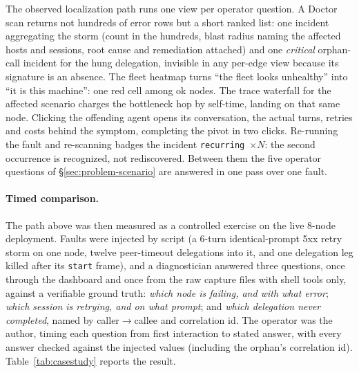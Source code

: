 The observed localization path runs one view per operator question. A
Doctor scan returns not hundreds of error rows but a short ranked list:
one incident aggregating the storm (count in the hundreds, blast radius
naming the affected hosts and sessions, root cause and remediation
attached) and one \emph{critical} orphan-call incident for the hung
delegation, invisible in any per-edge view because its signature is an
absence. The fleet heatmap turns ``the fleet looks unhealthy'' into
``it is this machine'': one red cell among ok nodes. The trace
waterfall for the affected scenario charges the bottleneck hop by
self-time, landing on that same node. Clicking the offending agent
opens its conversation, the actual turns, retries and costs behind the
symptom, completing the pivot in two clicks. Re-running the fault
and re-scanning badges the incident \texttt{recurring $\times N$}: the
second occurrence is recognized, not rediscovered. Between them the five
operator questions of \S\ref{sec:problem-scenario} are answered in one
pass over one fault.

\paragraph{Timed comparison.} The path above was then measured as a
controlled exercise on the live 8-node deployment. Faults were injected
by script (a 6-turn identical-prompt 5xx retry storm on one node, twelve
peer-timeout delegations into it, and one delegation leg killed after
its \texttt{start} frame), and a diagnostician answered three questions,
once through the dashboard and once from the raw capture files with
shell tools only, against a verifiable ground truth: \emph{which node is
failing, and with what error}; \emph{which session is retrying, and on
what prompt}; and \emph{which delegation never completed}, named by
caller${\to}$callee and correlation id. The operator was the author, timing each question
from first interaction to stated answer, with every answer checked
against the injected values (including the orphan's correlation id).
Table~\ref{tab:casestudy} reports the result.

